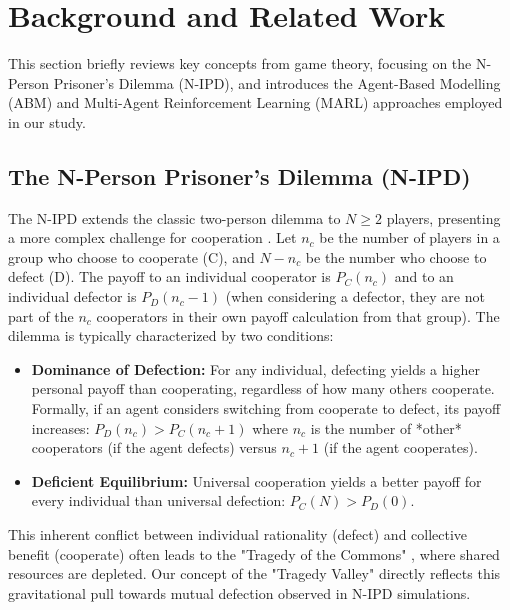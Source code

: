 \documentclass[]{llncs} %
\begin{document}
\section{Background and Related Work}
\label{sec:litreview}

This section briefly reviews key concepts from game theory, focusing on the N-Person Prisoner's Dilemma (N-IPD), and introduces the Agent-Based Modelling (ABM) and Multi-Agent Reinforcement Learning (MARL) approaches employed in our study. 

\subsection{The N-Person Prisoner's Dilemma (N-IPD)}
The N-IPD extends the classic two-person dilemma to $N \ge 2$ players, presenting a more complex challenge for cooperation \cite{Hamburger1973, Hardin1971}. %
Let $n_c$ be the number of players in a group who choose to cooperate (C), and $N-n_c$ be the number who choose to defect (D). The payoff to an individual cooperator is $P_C(n_c)$ and to an individual defector is $P_D(n_c-1)$ (when considering a defector, they are not part of the $n_c$ cooperators in their own payoff calculation from that group). The dilemma is typically characterized by two conditions:
\begin{itemize}
    \item \textbf{Dominance of Defection:} For any individual, defecting yields a higher personal payoff than cooperating, regardless of how many others cooperate. Formally, if an agent considers switching from cooperate to defect, its payoff increases: $P_D(n_c) > P_C(n_c+1)$ where $n_c$ is the number of *other* cooperators (if the agent defects) versus $n_c+1$ (if the agent cooperates).
    \item \textbf{Deficient Equilibrium:} Universal cooperation yields a better payoff for every individual than universal defection: $P_C(N) > P_D(0)$.
\end{itemize}
This inherent conflict between individual rationality (defect) and collective benefit (cooperate) often leads to the "Tragedy of the Commons" \cite{Hardin1968}, where shared resources are depleted. Our concept of the "Tragedy Valley" directly reflects this gravitational pull towards mutual defection observed in N-IPD simulations.
\end{document}

